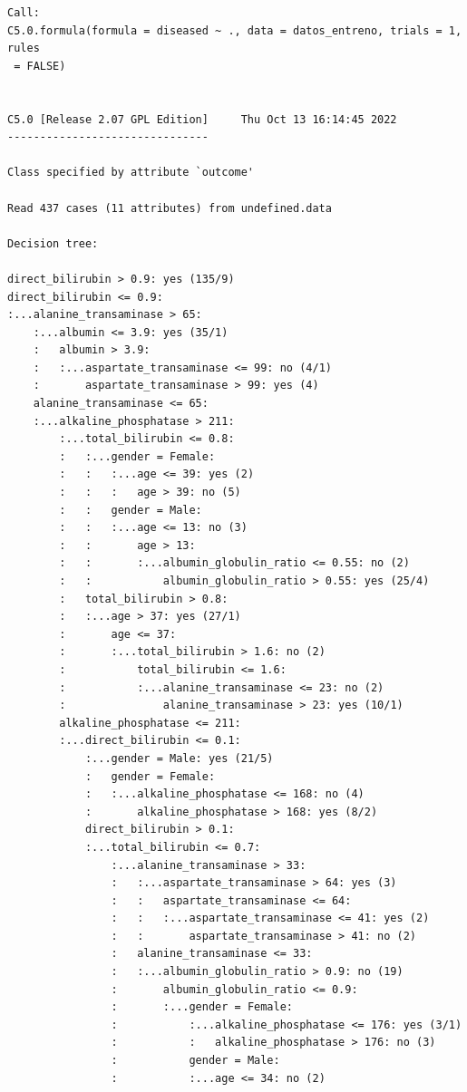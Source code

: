 \documentclass[
  11pt,
  a4paper,
]{article}
\begin{document}
\begin{verbatim}
Call:
C5.0.formula(formula = diseased ~ ., data = datos_entreno, trials = 1, rules
 = FALSE)


C5.0 [Release 2.07 GPL Edition]     Thu Oct 13 16:14:45 2022
-------------------------------

Class specified by attribute `outcome'

Read 437 cases (11 attributes) from undefined.data

Decision tree:

direct_bilirubin > 0.9: yes (135/9)
direct_bilirubin <= 0.9:
:...alanine_transaminase > 65:
    :...albumin <= 3.9: yes (35/1)
    :   albumin > 3.9:
    :   :...aspartate_transaminase <= 99: no (4/1)
    :       aspartate_transaminase > 99: yes (4)
    alanine_transaminase <= 65:
    :...alkaline_phosphatase > 211:
        :...total_bilirubin <= 0.8:
        :   :...gender = Female:
        :   :   :...age <= 39: yes (2)
        :   :   :   age > 39: no (5)
        :   :   gender = Male:
        :   :   :...age <= 13: no (3)
        :   :       age > 13:
        :   :       :...albumin_globulin_ratio <= 0.55: no (2)
        :   :           albumin_globulin_ratio > 0.55: yes (25/4)
        :   total_bilirubin > 0.8:
        :   :...age > 37: yes (27/1)
        :       age <= 37:
        :       :...total_bilirubin > 1.6: no (2)
        :           total_bilirubin <= 1.6:
        :           :...alanine_transaminase <= 23: no (2)
        :               alanine_transaminase > 23: yes (10/1)
        alkaline_phosphatase <= 211:
        :...direct_bilirubin <= 0.1:
            :...gender = Male: yes (21/5)
            :   gender = Female:
            :   :...alkaline_phosphatase <= 168: no (4)
            :       alkaline_phosphatase > 168: yes (8/2)
            direct_bilirubin > 0.1:
            :...total_bilirubin <= 0.7:
                :...alanine_transaminase > 33:
                :   :...aspartate_transaminase > 64: yes (3)
                :   :   aspartate_transaminase <= 64:
                :   :   :...aspartate_transaminase <= 41: yes (2)
                :   :       aspartate_transaminase > 41: no (2)
                :   alanine_transaminase <= 33:
                :   :...albumin_globulin_ratio > 0.9: no (19)
                :       albumin_globulin_ratio <= 0.9:
                :       :...gender = Female:
                :           :...alkaline_phosphatase <= 176: yes (3/1)
                :           :   alkaline_phosphatase > 176: no (3)
                :           gender = Male:
                :           :...age <= 34: no (2)

\end{verbatim}
\end{document}
